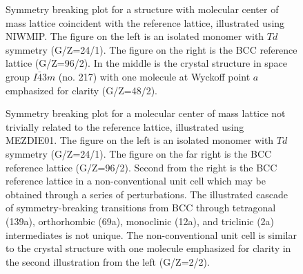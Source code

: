 \documentclass[preprint]{iucr}              %
\begin{document}
\begin{figure}
\caption{Symmetry breaking plot for a structure with molecular center of mass lattice coincident with the reference lattice, illustrated using NIWMIP.  The figure on the left is an isolated monomer with $Td$ symmetry (G/Z=24/1).  The figure on the right is the BCC reference lattice (G/Z=96/2).  In the middle is the crystal structure in space group $I\bar{4}3m$ (no. 217) with one molecule at Wyckoff point $a$ emphasized for clarity (G/Z=48/2).}
\label{fig_NIWMIP}
\end{figure}

\begin{figure}
\caption{Symmetry breaking plot for a molecular center of mass lattice not trivially related to the reference lattice, illustrated using MEZDIE01.  The figure on the left is an isolated monomer with $Td$ symmetry (G/Z=24/1).  The figure on the far right is the BCC reference lattice (G/Z=96/2).  Second from the right is the BCC reference lattice in a non-conventional unit cell which may be obtained through a series of perturbations.  The illustrated cascade of symmetry-breaking transitions from BCC through tetragonal (139a), orthorhombic (69a), monoclinic (12a), and triclinic (2a) intermediates is not unique.  The non-conventional unit cell is similar to the crystal structure with one molecule emphasized for clarity in the second illustration from the left (G/Z=2/2).}
\label{fig_MEZDIE01}
\end{figure}
\end{document}
